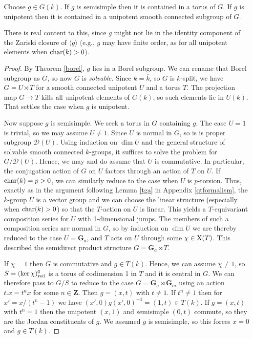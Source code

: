 \documentclass[10pt]{article}
\newcommand{\ZZ}{\mathbf{Z}}
\renewcommand{\(}{\left(}
\renewcommand{\)}{\right)}
\numberwithin{thm}{subsection}
\begin{document}
\begin{proposition} Choose $g \in G(k)$.  If $g$ is semisimple then it is contained
in a torus of $G$.  If $g$ is unipotent then it is contained in a unipotent smooth connected
subgroup of $G$.
\end{proposition}

There is real content to this, since $g$ might not lie in the identity component of
the Zariski closure of $\langle g \rangle$ (e.g., $g$ may have finite order, as
for all unipotent elements when ${\rm{char}}(k) > 0$). 

\begin{proof}
By Theorem \ref{borel}, $g$ lies in a Borel subgroup. We can rename that Borel subgroup as $G$,
so now $G$ is {\em solvable}.  Since $k = \overline{k}$, so $G$ is $k$-split,
we have $G = U \rtimes T$ for a smooth connected unipotent $U$ and a torus
$T$.  The projection map $G \rightarrow T$ kills all unipotent
elements of $G(k)$, so such elements lie in $U(k)$.
That settles the case when $g$ is unipotent.

Now suppose $g$ is semisimple.  We seek a torus in $G$ containing $g$.  The case $U = 1$
is trivial,  so we may assume $U \ne 1$.  Since $U$ is normal in $G$, so is is proper subgroup 
$\mathscr{D}(U)$. Using induction on $\dim U$ and
the general structure of solvable smooth connected $k$-groups, 
it suffices to solve the problem for $G/\mathscr{D}(U)$.  
Hence, we may and do assume that $U$ is commutative.
In particular, the conjugation action of $G$ on $U$ factors through an action of $T$ on $U$. 
If ${\rm{char}}(k) = p > 0$, we can similarly reduce to the case when
$U$ is $p$-torsion.    Thus, exactly as in the argument following
Lemma \ref{tga} in Appendix \ref{qtformalism}, the $k$-group $U$ 
is a vector group and we can choose the linear structure (especially when
${\rm{char}}(k) > 0$) so that the $T$-action on $U$ is linear.
This yields a $T$-equivariant composition series for $U$ with 1-dimensional jumps.
The members of such a composition series are normal in $G$, so by induction on $\dim U$ 
we are thereby reduced to the case $U = \mathbf{G}_a$, and
$T$ acts on $U$ through some $\chi \in {\rm{X}}(T)$.  This described the
semidirect product structure $G = \mathbf{G}_a \rtimes T$. 

If $\chi = 1$ then $G$ is commutative and $g \in T(k)$. Hence, 
we can assume $\chi \ne 1$, so $S = (\ker \chi)_{\rm{red}}^0$ is a torus of codimension 1 in $T$
and it is central in $G$.   We can therefore pass to $G/S$ to reduce
to the case $G = \mathbf{G}_a \rtimes \mathbf{G}_m$
using an action $t.x = t^n x$ for some $n \in \ZZ$.  Then
$g = (x,t)$ with $t \ne 1$.  If $t^n \ne 1$ then for $x' =  x/(t^n-1)$ we have $(x',0)g(x',0)^{-1} = (1,t) \in T(k)$. 
If $g = (x,t)$ with $t^n = 1$ then the unipotent $(x,1)$ and semisimple $(0,t)$ commute,
so they are the Jordan constituents of $g$.  We assumed $g$ is semisimple, so
this forces $x = 0$ and $g \in T(k)$. 
\end{proof}
\end{document}
